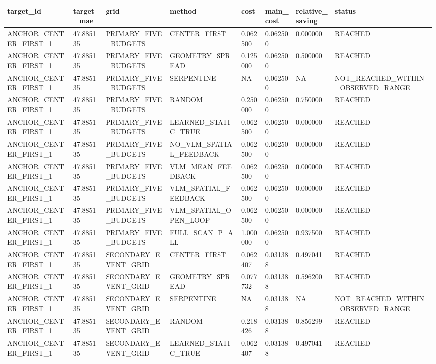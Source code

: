 \begin{tabular}{llllllll}
\hline
target\_id & target\_mae & grid & method & cost & main\_cost & relative\_saving & status \\
\hline
ANCHOR\_CENTER\_FIRST\_1 & 47.885135 & PRIMARY\_FIVE\_BUDGETS & CENTER\_FIRST & 0.062500 & 0.062500 & 0.000000 & REACHED \\
ANCHOR\_CENTER\_FIRST\_1 & 47.885135 & PRIMARY\_FIVE\_BUDGETS & GEOMETRY\_SPREAD & 0.125000 & 0.062500 & 0.500000 & REACHED \\
ANCHOR\_CENTER\_FIRST\_1 & 47.885135 & PRIMARY\_FIVE\_BUDGETS & SERPENTINE & NA & 0.062500 & NA & NOT\_REACHED\_WITHIN\_OBSERVED\_RANGE \\
ANCHOR\_CENTER\_FIRST\_1 & 47.885135 & PRIMARY\_FIVE\_BUDGETS & RANDOM & 0.250000 & 0.062500 & 0.750000 & REACHED \\
ANCHOR\_CENTER\_FIRST\_1 & 47.885135 & PRIMARY\_FIVE\_BUDGETS & LEARNED\_STATIC\_TRUE & 0.062500 & 0.062500 & 0.000000 & REACHED \\
ANCHOR\_CENTER\_FIRST\_1 & 47.885135 & PRIMARY\_FIVE\_BUDGETS & NO\_VLM\_SPATIAL\_FEEDBACK & 0.062500 & 0.062500 & 0.000000 & REACHED \\
ANCHOR\_CENTER\_FIRST\_1 & 47.885135 & PRIMARY\_FIVE\_BUDGETS & VLM\_MEAN\_FEEDBACK & 0.062500 & 0.062500 & 0.000000 & REACHED \\
ANCHOR\_CENTER\_FIRST\_1 & 47.885135 & PRIMARY\_FIVE\_BUDGETS & VLM\_SPATIAL\_FEEDBACK & 0.062500 & 0.062500 & 0.000000 & REACHED \\
ANCHOR\_CENTER\_FIRST\_1 & 47.885135 & PRIMARY\_FIVE\_BUDGETS & VLM\_SPATIAL\_OPEN\_LOOP & 0.062500 & 0.062500 & 0.000000 & REACHED \\
ANCHOR\_CENTER\_FIRST\_1 & 47.885135 & PRIMARY\_FIVE\_BUDGETS & FULL\_SCAN\_P\_ALL & 1.000000 & 0.062500 & 0.937500 & REACHED \\
ANCHOR\_CENTER\_FIRST\_1 & 47.885135 & SECONDARY\_EVENT\_GRID & CENTER\_FIRST & 0.062407 & 0.031388 & 0.497041 & REACHED \\
ANCHOR\_CENTER\_FIRST\_1 & 47.885135 & SECONDARY\_EVENT\_GRID & GEOMETRY\_SPREAD & 0.077732 & 0.031388 & 0.596200 & REACHED \\
ANCHOR\_CENTER\_FIRST\_1 & 47.885135 & SECONDARY\_EVENT\_GRID & SERPENTINE & NA & 0.031388 & NA & NOT\_REACHED\_WITHIN\_OBSERVED\_RANGE \\
ANCHOR\_CENTER\_FIRST\_1 & 47.885135 & SECONDARY\_EVENT\_GRID & RANDOM & 0.218426 & 0.031388 & 0.856299 & REACHED \\
ANCHOR\_CENTER\_FIRST\_1 & 47.885135 & SECONDARY\_EVENT\_GRID & LEARNED\_STATIC\_TRUE & 0.062407 & 0.031388 & 0.497041 & REACHED \\

\end{tabular}
